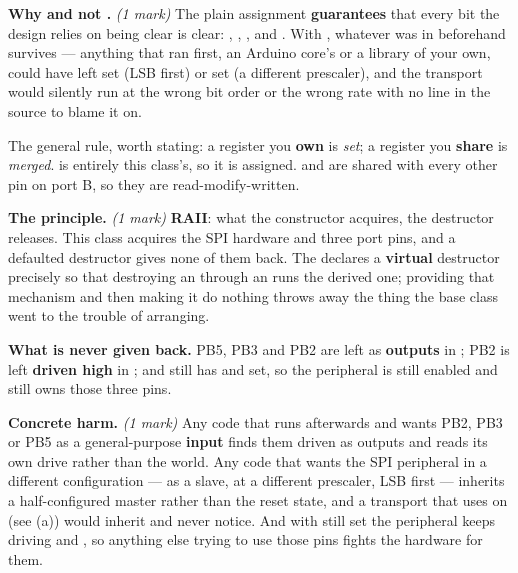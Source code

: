 \textbf{Why  and not .} \textit{(1 mark)} The plain assignment
\textbf{guarantees} that every bit the design relies on being clear is clear: ,
, ,  and . With \code{|=}, whatever was in 
beforehand survives --- anything that ran first, an Arduino core's  or a library
of your own, could have left  set (LSB first) or  set (a different prescaler),
and the transport would silently run at the wrong bit order or the wrong rate with no line in the
source to blame it on.

The general rule, worth stating: a register you \textbf{own} is \emph{set}; a register you
\textbf{share} is \emph{merged}.  is entirely this class's, so it is assigned.
 and  are shared with every other pin on port B, so they are
read-modify-written.

\textbf{The principle.} \textit{(1 mark)} \textbf{RAII}: what the constructor acquires, the
destructor releases. This class acquires the SPI hardware and three port pins, and a defaulted
destructor gives none of them back. The  declares a \textbf{virtual} destructor
precisely so that destroying an  through an  runs the derived one;
providing that mechanism and then making it do nothing throws away the thing the base class went to
the trouble of arranging.

\textbf{What is never given back.} PB5, PB3 and PB2 are left as \textbf{outputs} in ;
PB2 is left \textbf{driven high} in ; and  still has  and
 set, so the peripheral is still enabled and still owns those three pins.

\textbf{Concrete harm.} \textit{(1 mark)} Any code that runs afterwards and wants PB2, PB3 or PB5 as
a general-purpose \textbf{input} finds them driven as outputs and reads its own drive rather than the
world. Any code that wants the SPI peripheral in a different configuration --- as a slave, at a
different prescaler, LSB first --- inherits a half-configured master rather than the reset state, and
a transport that uses \code{|=} on  (see (a)) would inherit  and never notice.
And with  still set the peripheral keeps driving  and , so anything
else trying to use those pins fights the hardware for them.

